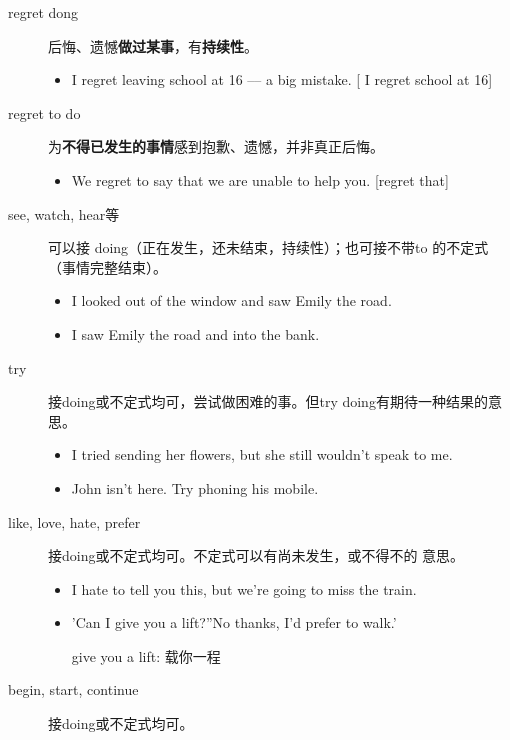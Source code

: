 \begin{description}
\item[regret dong] 后悔、遗憾\textbf{做过某事}，有\textbf{持续性}。

  \begin{itemize}
  \item I regret leaving school at 16 –-- a big mistake. [ I regret  school at 16]
  \end{itemize}

\item[regret to do] 为\textbf{不得已发生的事情}感到抱歉、遗憾，并非真正后悔。

  \begin{itemize}
  \item We regret to say that we are unable to help you. [regret  that]
  \end{itemize}

\item[see, watch, hear等] 可以接 doing（正在发生，还未结束，持续性）；也可接不带to
  的不定式（事情完整结束）。
  \begin{itemize}
  \item I looked out of the window and saw Emily  the road.
  \item I saw Emily  the road and  into the bank.
  \end{itemize}


\item[try] 接doing或不定式均可，尝试做困难的事。但try doing有期待一种结果的意思。
  \begin{itemize}
  \item I tried sending her flowers, but she still wouldn't speak to me.
  \item John isn't here. Try phoning his mobile.
  \end{itemize}
\item[like, love, hate, prefer] 接doing或不定式均可。不定式可以有尚未发生，或不得不的
  意思。
  \begin{itemize}
  \item I hate to tell you this, but we're going to miss the train.

  \item 'Can I give you a lift?''No thanks, I'd prefer to walk.'

    give you a lift: 载你一程
  \end{itemize}

\item[begin, start, continue] 接doing或不定式均可。


\end{description}
